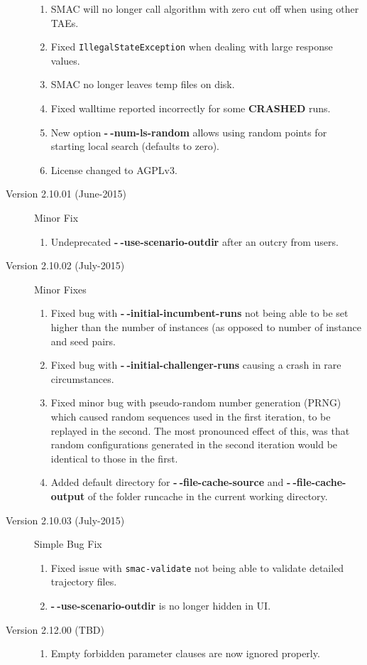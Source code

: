 \documentclass[11pt,letterpaper,oneside]{article}
\begin{document}
\begin{description}
\begin{enumerate}
				\item SMAC will no longer call algorithm with zero cut off when using other TAEs.
				\item Fixed \texttt{IllegalStateException} when dealing with large response values.
				\item SMAC no longer leaves temp files on disk.
				\item Fixed walltime reported incorrectly for some \textbf{CRASHED} runs.
				\item New option \textbf{-$~\!$-num-ls-random} allows using random points for starting local search (defaults to zero).
				\item License changed to AGPLv3.
			\end{enumerate}
	\item[Version 2.10.01 (June-2015)] Minor Fix
		\begin{enumerate}
			\item Undeprecated \textbf{-$~\!$-use-scenario-outdir} after an outcry from users.
		\end{enumerate}
	\item[Version 2.10.02 (July-2015)] Minor Fixes
		\begin{enumerate}
			\item Fixed bug with \textbf{-$~\!$-initial-incumbent-runs} not being able to be set higher than the number of instances (as opposed to number of instance and seed pairs.
			\item Fixed bug with \textbf{-$~\!$-initial-challenger-runs} causing a crash in rare circumstances.
			\item Fixed minor bug with pseudo-random number generation (PRNG) which caused random sequences used in the first iteration, to be replayed in the second. The most pronounced effect of this, was that random configurations generated in the second iteration would be identical to those in the first. 
			\item Added default directory for \textbf{-$~\!$-file-cache-source} and \textbf{-$~\!$-file-cache-output} of the folder runcache in the current working directory.
		\end{enumerate}
	\item[Version 2.10.03 (July-2015)] Simple Bug Fix
		\begin{enumerate}
			\item Fixed issue with \texttt{smac-validate} not being able to validate detailed trajectory files.		
			\item \textbf{-$~\!$-use-scenario-outdir} is no longer hidden in UI.
		\end{enumerate}
		
	\item[Version 2.12.00 (TBD)]
	    \begin{enumerate}
	        \item Empty forbidden parameter clauses are now ignored properly.
	    \end{enumerate}

				
		

	\end{description}
\end{document}
